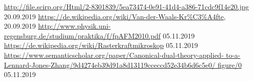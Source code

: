 \begin{thebibliography}{xxx}
        \url{http://file.scirp.org/Html/2-8301839/5ea73474-0e91-41d4-a386-71cdc9f14e20.jpg}
        20.09.2019
        \url{https://de.wikipedia.org/wiki/Van-der-Waals-Kr%C3%A4fte},
		20.09.2019
        \url{http://www.physik.uni-regensburg.de/studium/praktika/f/fpAFM2010.pdf}
        05.11.2019
        \url{https://de.wikipedia.org/wiki/Rasterkraftmikroskop}
        05.11.2019
        \url{https://www.semanticscholar.org/paper/Canonical-dual-theory-applied-
             to-a-Lennard-Jones-Zhang/9d4274eb39d91a8d13119cceccd52e34b6d6c5e0/
             figure/0}
        05.11.2019
\end{thebibliography}
 
